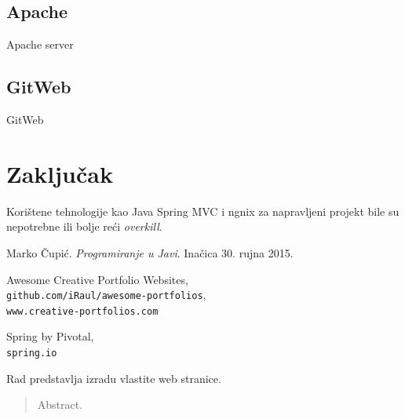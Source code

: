 \documentclass[times, utf8, zavrsni, numeric]{fer}
\begin{document}
\section{Apache}
\qquad Apache server

\section{GitWeb}
\qquad GitWeb

\chapter{Zaključak}
Korištene tehnologije kao Java Spring MVC i ngnix za napravljeni projekt bile su nepotrebne ili bolje reći \textit{overkill}\footnotemark.



\begin{thebibliography}{9}
\bibitem{}
				Marko Čupić.
				\textit{Programiranje u Javi}.
				Inačica 30. rujna 2015.

				Awesome Creative Portfolio Websites,
				\\\texttt{github.com/iRaul/awesome-portfolios},
				\\\texttt{www.creative-portfolios.com}

				Spring by Pivotal,
				\\\texttt{spring.io}
\end{thebibliography}

\begin{sazetak}
\qquad Rad predstavlja izradu vlastite web stranice.

\end{sazetak}

\begin{abstract}
Abstract.

\end{abstract}
\end{document}
